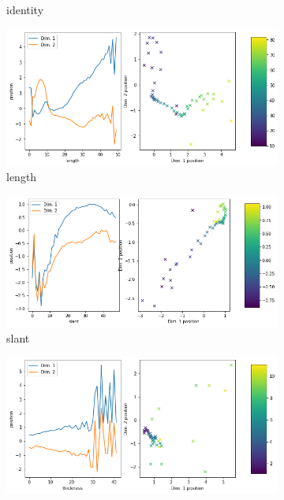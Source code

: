 \begin{figure}[H]
\begin{subfigure}{.48\textwidth}
        \caption{identity}
    \end{subfigure}
    \hfill
    \begin{subfigure}{.48\textwidth}
        \includegraphics[width=\textwidth]{images/latent_space_traversals/vae_gan_mnist_morpho_latent_space_values_length.png}
        \caption{length}
    \end{subfigure}
    \begin{subfigure}{.48\textwidth}
        \includegraphics[width=\textwidth]{images/latent_space_traversals/vae_gan_mnist_morpho_latent_space_values_slant.png}
        \caption{slant}
    \end{subfigure}
    \hfill
    \begin{subfigure}{.48\textwidth}
        \includegraphics[width=\textwidth]{images/latent_space_traversals/vae_gan_mnist_morpho_latent_space_values_thickness.png}

\end{subfigure}
\end{figure}
